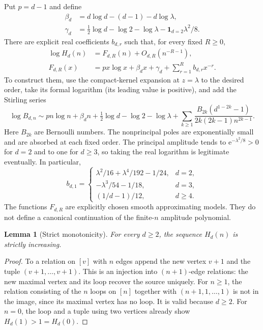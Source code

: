 \documentclass[11pt,a4paper]{article}
\newtheorem{lemma}[theorem]{Lemma}
\theoremstyle{definition}\newtheorem{definition}[theorem]{Definition}
\theoremstyle{remark}\newtheorem{remark}[theorem]{Remark}
\newcommand{\lam}{\lambda}
\newcommand{\e}{\mathrm e}
\begin{document}
Put $p=d-1$ and define
\begin{align}
 \beta_d&=d\log d-(d-1)-d\log\lam,\nonumber\\
 \gamma_d&=\tfrac12\log d-\log2-\log\lam
                    -\mathbf1_{d=2}\lam^2/8.\label{otr:eq:betagamma}
\end{align}
There are explicit real coefficients $b_{d,r}$ such that, for every fixed $R\ge0$,
\begin{align}
 \log H_d(n)&=F_{d,R}(n)+O_{d,R}(n^{-R-1}),\label{otr:eq:logH}\\
 F_{d,R}(x)&=p x\log x+\beta_d x+\gamma_d
                  +\sum_{r=1}^{R}b_{d,r}x^{-r}.\label{otr:eq:F}
\end{align}
To construct them, use the compact-kernel expansion at $z=\lam$ to the desired order, take its formal logarithm (its leading value is positive), and add the Stirling series
\begin{equation}\label{otr:eq:Bernoulli}
 \log B_{d,n}\sim p n\log n+\beta_d n
 +\tfrac12\log d-\log2-\log\lam
 +\sum_{k\ge1}\frac{B_{2k}(d^{1-2k}-1)}{2k(2k-1)n^{2k-1}}.
\end{equation}
Here $B_{2k}$ are Bernoulli numbers. The nonprincipal poles are exponentially small and are absorbed at each fixed order. The principal amplitude tends to $\e^{-\lam^2/8}>0$ for $d=2$ and to one for $d\ge3$, so taking the real logarithm is legitimate eventually. In particular,
\begin{equation}\label{otr:eq:b1}
 b_{d,1}=\begin{cases}
 \lam^2/16+\lam^4/192-1/24,&d=2,\\
 -\lam^3/54-1/18,&d=3,\\
 (1/d-1)/12,&d\ge4.
 \end{cases}
\end{equation}
The functions $F_{d,R}$ are explicitly chosen smooth approximating models. They do not define a canonical continuation of the finite-$n$ amplitude polynomial.

\begin{lemma}[Strict monotonicity]\label{otr:lem:mono}
For every $d\ge2$, the sequence $H_d(n)$ is strictly increasing.
\end{lemma}
\begin{proof}
To a relation on $[v]$ with $n$ edges append the new vertex $v+1$ and the tuple $(v+1,\ldots,v+1)$. This is an injection into $(n+1)$-edge relations: the new maximal vertex and its loop recover the source uniquely. For $n\ge1$, the relation consisting of the $n$ loops on $[n]$ together with $(n+1,1,\ldots,1)$ is not in the image, since its maximal vertex has no loop. It is valid because $d\ge2$. For $n=0$, the loop and a tuple using two vertices already show $H_d(1)>1=H_d(0)$.
\end{proof}
\end{document}
